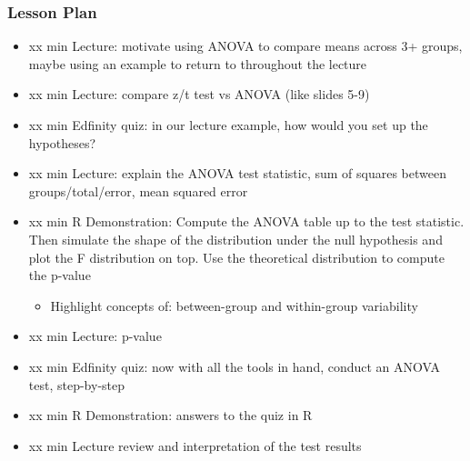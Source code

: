 \begin{frame}
    \frametitle{Lesson Plan}
    \begin{itemize}
        \item xx min Lecture: motivate using ANOVA to compare means across 3+ groups, maybe using an example to return to throughout the lecture
        \item xx min Lecture: compare z/t test vs ANOVA (like slides 5-9)
        \item xx min Edfinity quiz: in our lecture example, how would you set up the hypotheses?
        \item xx min Lecture: explain the ANOVA test statistic, sum of squares between groups/total/error, mean squared error
        \item xx min R Demonstration: Compute the ANOVA table up to the test statistic. Then simulate the shape of the distribution under the null hypothesis and plot the F distribution on top. Use the theoretical distribution to compute the p-value
        \begin{itemize}
            \item Highlight concepts of: between-group and within-group variability 
        \end{itemize}
        \item xx min Lecture: p-value
        \item xx min Edfinity quiz: now with all the tools in hand, conduct an ANOVA test, step-by-step
        \item xx min R Demonstration: answers to the quiz in R
        \item xx min Lecture review and interpretation of the test results
    \end{itemize}
\end{frame}

